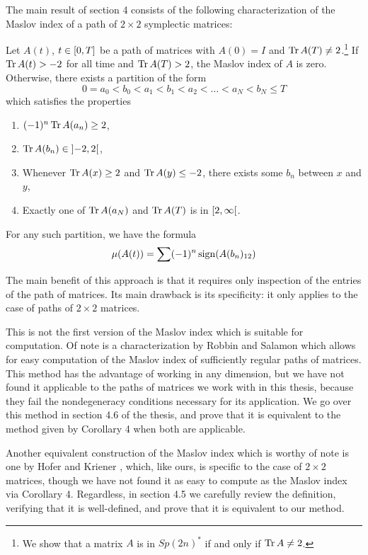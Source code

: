 The main result of section 4 consists of the following characterization of the Maslov index of a path of $2 \times 2$ symplectic matrices:
\begin{prop}[Corollary 4]
Let $A(t)$, $t \in \interval 0 T$ be a path of matrices with $A(0) = I$ and $\operatorname{Tr} A(T) \neq 2$.\footnote{We show that a matrix $A$ is in $Sp(2n)^*$ if and only if $\operatorname{Tr} A \neq 2$.} If $\operatorname{Tr} A(t) > -2$ for all time and $\operatorname{Tr} A(T) > 2$, the Maslov index of $A$ is zero. Otherwise, there exists a partition of the form
\begin{equation}
0 = a_0 < b_0 < a_1 < b_1 < a_2 < \dots < a_N < b_N \leq T
\end{equation}
which satisfies the properties
\begin{enumerate}
\item $(-1)^n \operatorname{Tr} A(a_n) \geq 2$,
\item $\trace A(b_n) \in \ointerval{-2}2$,
\item Whenever $\operatorname{Tr} A(x) \geq 2$ and $\operatorname{Tr} A(y) \leq -2$, there exists some $b_n$ between $x$ and $y$,
\item\label{calcmaslov:ab5} Exactly one of $\operatorname{Tr} A(a_N)$ and $\operatorname{Tr} A(T)$ is in $\rinterval 2 \infty$.
\end{enumerate}

For any such partition, we have the formula
\begin{equation}\label{calcmaslov:mu}
\mu(A(t)) = \sum (-1)^n \operatorname{sign}(A(b_n)_{12})
\end{equation}
\end{prop}

The main benefit of this approach is that it requires only inspection of the entries of the path of matrices. Its main drawback is its specificity: it only applies to the case of paths of $2 \times 2$ matrices.

This is not the first version of the Maslov index which is suitable for computation. Of note is a characterization by Robbin and Salamon \cite{robbin1993maslov} which allows for easy computation of the Maslov index of sufficiently regular paths of matrices. This method has the advantage of working in any dimension, but we have not found it applicable to the paths of matrices we work with in this thesis, because they fail the nondegeneracy conditions necessary for its application. We go over this method in section 4.6 of the thesis, and prove that it is equivalent to the method given by Corollary 4 when both are applicable.

Another equivalent construction of the Maslov index which is worthy of note is one by Hofer and Kriener \cite{hoferkriener}, which, like ours, is specific to the case of $2 \times 2$ matrices, though we have not found it as easy to compute as the Maslov index via Corollary 4. Regardless, in section 4.5 we carefully review the definition, verifying that it is well-defined, and prove that it is equivalent to our method.

